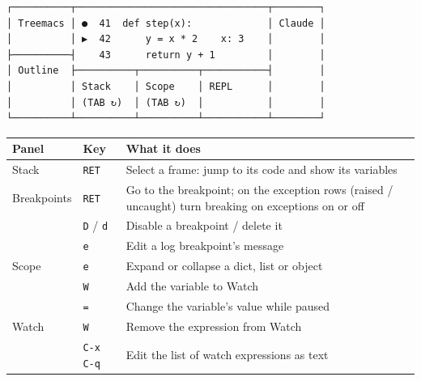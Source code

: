 \documentclass[11pt]{article}
\newcommand{\key}[1]{\texttt{#1}}
\begin{document}
\newpage

\begin{center}
\begin{BVerbatim}[fontfamily=dejavumono,fontsize=\fontsize{9}{10.6},baselinestretch=1]
┌──────────┬─────────────────────────────────┬────────┐
│ Treemacs │ ●  41  def step(x):             │ Claude │
│          │ ▶  42      y = x * 2    x: 3    │        │
├──────────┤    43      return y + 1         │        │
│ Outline  ├──────────┬──────────┬───────────┤        │
│          │ Stack    │ Scope    │ REPL      │        │
│          │ (TAB ↻)  │ (TAB ↻)  │           │        │
└──────────┴──────────┴──────────┴───────────┴────────┘
\end{BVerbatim}
\end{center}
\vspace{2pt}

\begin{tabularx}{\textwidth}{@{}ll>{\raggedright\arraybackslash}X@{}}
\toprule
\textbf{Panel} & \textbf{Key} & \textbf{What it does} \\
\midrule
Stack       & \key{RET}         & Select a frame: jump to its code and show its variables \\
Breakpoints & \key{RET}         & Go to the breakpoint; on the exception rows (raised / uncaught)
                                turn breaking on exceptions on or off \\
            & \key{D} / \key{d}   & Disable a breakpoint / delete it \\
            & \key{e}           & Edit a log breakpoint's message \\
Scope       & \key{e}           & Expand or collapse a dict, list or object \\
            & \key{W}           & Add the variable to Watch \\
            & \key{=}           & Change the variable's value while paused \\
Watch       & \key{W}           & Remove the expression from Watch \\
            & \key{C-x C-q}     & Edit the list of watch expressions as text \\
\bottomrule
\end{tabularx}
\end{document}
